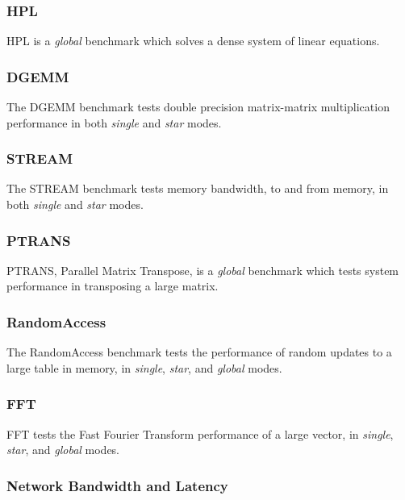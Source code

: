 %
%
\subsubsection{HPL}

HPL is a \emph{global} benchmark which solves a dense system of linear equations.


%
%
\subsubsection{DGEMM}

The DGEMM benchmark tests double precision matrix-matrix multiplication performance in both \emph{single} and \emph{star} modes.

 
%
%
\subsubsection{STREAM}

The STREAM benchmark tests memory bandwidth, to and from memory, in both \emph{single} and \emph{star} modes.


%
%
\subsubsection{PTRANS}

PTRANS, Parallel Matrix Transpose, is a \emph{global} benchmark which tests system performance in transposing a large matrix.


%
%
\subsubsection{RandomAccess}

The RandomAccess benchmark tests the performance of random updates to a large table in memory, in \emph{single}, \emph{star}, and \emph{global} modes.


%
%
\subsubsection{FFT}

FFT tests the Fast Fourier Transform performance of a large vector, in \emph{single}, \emph{star}, and \emph{global} modes.


%
%
\subsubsection{Network Bandwidth and Latency}

